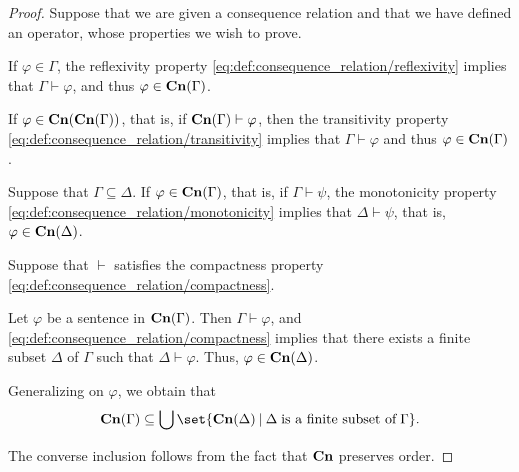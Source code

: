 \begin{proof}
   Suppose that we are given a consequence relation and that we have defined an operator, whose properties we wish to prove.

   If \( \varphi \in \Gamma \), the reflexivity property \eqref{eq:def:consequence_relation/reflexivity} implies that \( \Gamma \vdash \varphi \), and thus \( \varphi \in \op*{Cn}(\Gamma) \).

   If \( \varphi \in \op*{Cn}(\op*{Cn}(\Gamma)) \), that is, if \( \op*{Cn}(\Gamma) \vdash \varphi \), then the transitivity property \eqref{eq:def:consequence_relation/transitivity} implies that \( \Gamma \vdash \varphi \) and thus \( \varphi \in \op*{Cn}(\Gamma) \).

   Suppose that \( \Gamma \subseteq \Delta \). If \( \varphi \in \op*{Cn}(\Gamma) \), that is, if \( \Gamma \vdash \psi \), the monotonicity property \eqref{eq:def:consequence_relation/monotonicity} implies that \( \Delta \vdash \psi \), that is, \( \varphi \in \op*{Cn}(\Delta) \).

   Suppose that \( {\vdash} \) satisfies the compactness property \eqref{eq:def:consequence_relation/compactness}.

  Let \( \varphi \) be a sentence in \( \op*{Cn}(\Gamma) \). Then \( \Gamma \vdash \varphi \), and \eqref{eq:def:consequence_relation/compactness} implies that there exists a finite subset \( \Delta \) of \( \Gamma \) such that \( \Delta \vdash \varphi \). Thus, \( \varphi \in \op*{Cn}(\Delta) \).

  Generalizing on \( \varphi \), we obtain that
  \begin{equation*}
    \op*{Cn}(\Gamma) \subseteq \bigcup\set{ \op*{Cn}(\Delta) \given \Delta \T{is a finite subset of} \Gamma }.
  \end{equation*}

  The converse inclusion follows from the fact that \( \op*{Cn} \) preserves order.
\end{proof}


